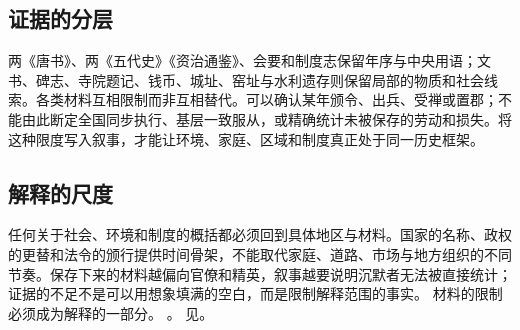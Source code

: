 \subsection{证据的分层} 两《唐书》、两《五代史》《资治通鉴》、会要和制度志保留年序与中央用语；文书、碑志、寺院题记、钱币、城址、窑址与水利遗存则保留局部的物质和社会线索。各类材料互相限制而非互相替代。可以确认某年颁令、出兵、受禅或置郡；不能由此断定全国同步执行、基层一致服从，或精确统计未被保存的劳动和损失。将这种限度写入叙事，才能让环境、家庭、区域和制度真正处于同一历史框架。 \subsection{解释的尺度} 任何关于社会、环境和制度的概括都必须回到具体地区与材料。国家的名称、政权的更替和法令的颁行提供时间骨架，不能取代家庭、道路、市场与地方组织的不同节奏。保存下来的材料越偏向官僚和精英，叙事越要说明沉默者无法被直接统计；证据的不足不是可以用想象填满的空白，而是限制解释范围的事实。 材料的限制必须成为解释的一部分。 。 见。